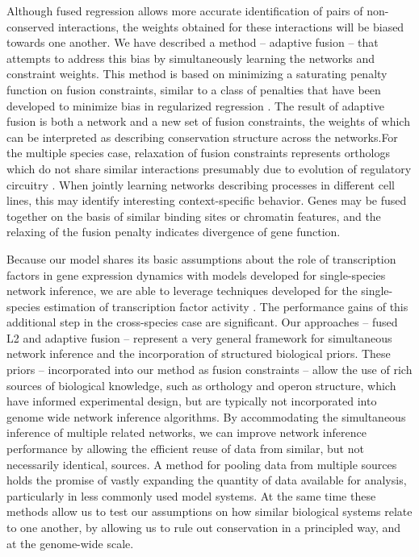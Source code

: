 \documentclass[11pt]{article}
\begin{document}
Although fused regression allows more accurate identification of pairs of non-conserved interactions, the weights obtained for these interactions will be biased towards one another. We have described a method -- adaptive fusion -- that attempts to address this bias by simultaneously learning the networks and constraint weights. This method is based on minimizing a saturating penalty function on fusion constraints, similar to a class of penalties that have been developed to minimize bias in regularized regression \cite{fan2001variable,zhang2010nearly}. 
The result of adaptive fusion is both a network and a new set of fusion constraints, the weights of which can be interpreted as describing conservation structure across the networks.For the multiple species case, relaxation of fusion constraints represents orthologs which do not share similar interactions presumably due to evolution of regulatory circuitry \cite{kellis_proof_2004}. %
When jointly learning networks describing processes in different cell lines, this may identify interesting context-specific behavior. Genes may be fused together on the basis of similar binding sites or chromatin features, and the relaxing of the fusion penalty indicates divergence of gene function. 

Because our model shares its basic assumptions about the role of transcription factors in gene expression dynamics with models developed for single-species network inference, we are able to leverage techniques developed for the single-species estimation of transcription factor activity \cite{fu_reconstructing_2011}. 
The performance gains of this additional step in the cross-species case are significant.
Our approaches -- fused L2 and adaptive fusion -- represent a very general framework for simultaneous network inference and the incorporation of structured biological priors. 
These priors -- incorporated into our method as fusion constraints -- allow the use of rich sources of biological knowledge, such as orthology and operon structure, which have informed experimental design, but are typically not incorporated into genome wide network inference algorithms. 
By accommodating the simultaneous inference of multiple related networks, we can improve network inference performance by allowing the efficient reuse of data from similar, but not necessarily identical, sources. 
A method for pooling data from multiple sources holds the promise of vastly expanding the quantity of data available for analysis, particularly in less commonly used model systems. 
At the same time these methods allow us to test our assumptions on how similar biological systems relate to one another, by allowing us to rule out conservation in a principled way, and at the genome-wide scale. 
\end{document}
